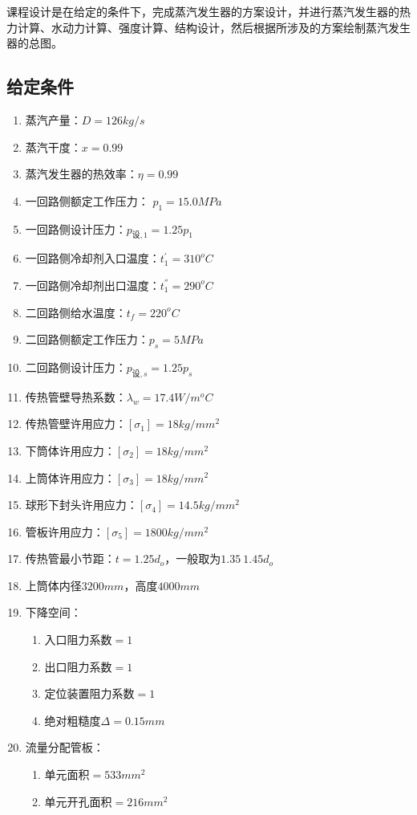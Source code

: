课程设计是在给定的条件下，完成蒸汽发生器的方案设计，并进行蒸汽发生器的热力计算、水动力计算、强度计算、结构设计，然后根据所涉及的方案绘制蒸汽发生器的总图。

\subsection{给定条件}
\begin{enumerate}
    \item 蒸汽产量：$ D = 126 kg/s $
    \item 蒸汽干度：$ x = 0.99 $
    \item 蒸汽发生器的热效率：$ \eta = 0.99 $
    \item 一回路侧额定工作压力： $ p_1 = 15.0 MPa$
    \item 一回路侧设计压力：$ p_{\text{设},1} = 1.25 p_1 $
    \item 一回路侧冷却剂入口温度：$ t_{1}^{'} = 310^oC $
    \item 一回路侧冷却剂出口温度：$ t_{1}^{''} = 290^oC $
    \item 二回路侧给水温度：$ t_{f} = 220^oC $
    \item 二回路侧额定工作压力：$ p_{s} = 5 MPa $
    \item 二回路侧设计压力：$ p_{\text{设},s} = 1.25 p_{s} $
    \item 传热管壁导热系数：$ \lambda_{w} = 17.4 W/m ^oC $
    \item 传热管壁许用应力：$ [\sigma_1] = 18 kg/mm^2 $
    \item 下筒体许用应力：$ [\sigma_2] = 18 kg/mm^2 $
    \item 上筒体许用应力：$ [\sigma_3] = 18 kg/mm^2 $
    \item 球形下封头许用应力：$ [\sigma_4] = 14.5 kg/mm^2 $
    \item 管板许用应力：$ [\sigma_5] = 1800 kg/mm^2 $
    \item 传热管最小节距：$ t = 1.25 d_o $，一般取为$ 1.35 ~ 1.45 d_o $
    \item 上筒体内径$ 3200 mm $，高度$ 4000 mm $
    \item 下降空间：
          \begin{enumerate}
              \item 入口阻力系数$=1$
              \item 出口阻力系数$=1$
              \item 定位装置阻力系数$=1$
              \item 绝对粗糙度$\Delta  =0.15 mm $
          \end{enumerate}
    \item 流量分配管板：
          \begin{enumerate}
              \item 单元面积$ =533 mm^2 $
              \item 单元开孔面积$ =216 mm^2 $
          \end{enumerate}
\end{enumerate}

